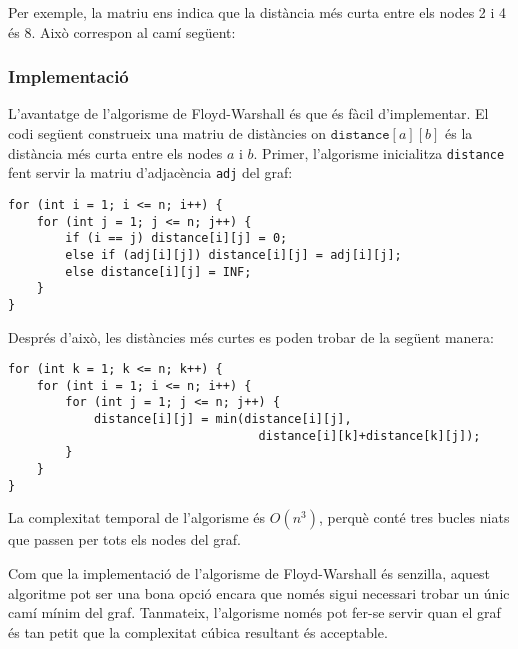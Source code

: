 Per exemple, la matriu ens indica que la distància més curta entre els
nodes 2 i 4 és 8. Això correspon al camí següent:


\begin{center}
\end{center}


\subsubsection{Implementació}

L'avantatge de l'algorisme de Floyd-Warshall és que és fàcil
d'implementar. El codi següent construeix una matriu de distàncies on
$\texttt{distance}[a][b]$ és la distància més curta entre els nodes
$a$ i $b$. Primer, l'algorisme inicialitza \texttt{distance} fent
servir la matriu d'adjacència \texttt{adj} del graf:


\begin{lstlisting}
for (int i = 1; i <= n; i++) {
    for (int j = 1; j <= n; j++) {
        if (i == j) distance[i][j] = 0;
        else if (adj[i][j]) distance[i][j] = adj[i][j];
        else distance[i][j] = INF;
    }
}
\end{lstlisting}
Després d'això, les distàncies més curtes es poden trobar de la següent manera:
\begin{lstlisting}
for (int k = 1; k <= n; k++) {
    for (int i = 1; i <= n; i++) {
        for (int j = 1; j <= n; j++) {
            distance[i][j] = min(distance[i][j],
                                   distance[i][k]+distance[k][j]);
        }
    }
}
\end{lstlisting}


La complexitat temporal de l'algorisme és $O(n^3)$, perquè conté tres
bucles niats que passen per tots els nodes del graf.

Com que la implementació de l'algorisme de Floyd-Warshall és senzilla,
aquest algoritme pot ser una bona opció encara que només sigui
necessari trobar un únic camí mínim del graf. Tanmateix, l'algorisme
només pot fer-se servir quan el graf és tan petit que la complexitat
cúbica resultant és acceptable.

